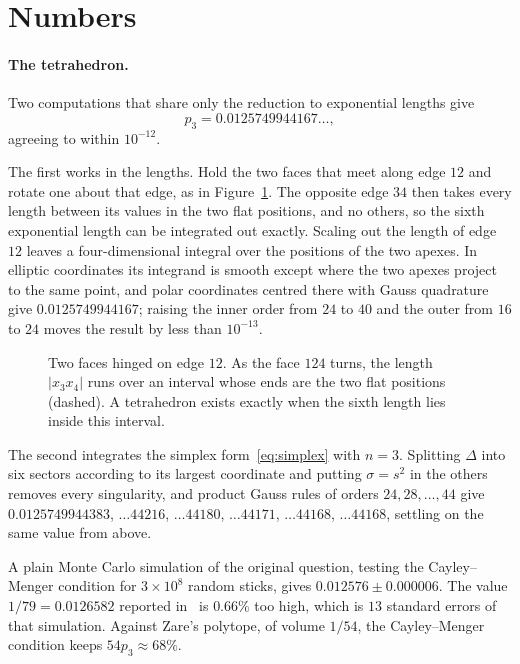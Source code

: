\documentclass[11pt]{article}
\theoremstyle{remark}
\newcommand{\abs}[1]{\left|#1\right|}
\begin{document}
\section{Numbers}\label{sec:numbers}

\paragraph{The tetrahedron.} Two computations that share only the reduction to exponential lengths give
\[
p_3=0.0125749944167\ldots,
\]
agreeing to within $10^{-12}$.

The first works in the lengths. Hold the two faces that meet along edge $12$ and rotate one about that
edge, as in Figure~\ref{fig:hinge}. The opposite edge $34$ then takes every length between its values in
the two flat positions, and no others, so the sixth exponential length can be integrated out exactly. Scaling
out the length of edge $12$ leaves a four-dimensional integral over the positions of the two apexes.
In elliptic coordinates its integrand is smooth except where the two apexes project to the same point, and
polar coordinates centred there with Gauss quadrature give $0.0125749944167$; raising the inner order from
$24$ to $40$ and the outer from $16$ to $24$ moves the result by less than $10^{-13}$.

\begin{figure}[ht]
\centering

\caption{Two faces hinged on edge $12$. As the face $124$ turns, the length $\abs{x_3x_4}$ runs over an
interval whose ends are the two flat positions (dashed). A tetrahedron exists exactly when the sixth length
lies inside this interval.}
\label{fig:hinge}
\end{figure}

The second integrates the simplex form~\eqref{eq:simplex} with $n=3$. Splitting $\Delta$ into six sectors
according to its largest coordinate and putting $\sigma=s^2$ in the others removes every singularity, and
product Gauss rules of orders $24,28,\dots,44$ give $0.0125749944383$, $\ldots44216$, $\ldots44180$,
$\ldots44171$, $\ldots44168$, $\ldots44168$, settling on the same value from above.

A plain Monte Carlo simulation of the original question, testing the Cayley--Menger condition for
$3\times10^8$ random sticks, gives $0.012576\pm0.000006$. The value $1/79=0.0126582$ reported
in~\cite{MO} is $0.66\%$ too high, which is $13$ standard errors of that simulation. Against Zare's
polytope, of volume $1/54$, the Cayley--Menger condition keeps $54p_3\approx 68\%$.
\end{document}
